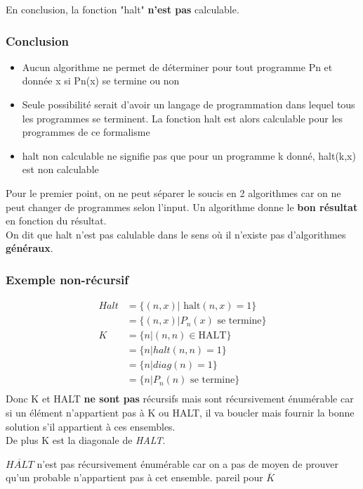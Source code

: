\documentclass{report}
\begin{document}
En conclusion, la fonction "halt" \textbf{n'est pas} calculable.

\subsubsection{Conclusion}
\begin{itemize}
\item  Aucun algorithme ne permet de déterminer pour tout programme Pn et donnée x si Pn(x) se termine ou non
\item Seule possibilité serait d’avoir un langage de programmation dans lequel tous les programmes se terminent. La fonction halt est alors calculable pour les programmes de ce formalisme
\item halt non calculable ne signifie pas que pour un programme k donné, halt(k,x) est
non calculable
\end{itemize}
Pour le premier point, on ne peut séparer le soucis en 2 algorithmes car on ne peut changer de programmes selon l'input. Un algorithme donne le \textbf{bon résultat} en fonction du résultat.\\

On dit que halt n'est pas calulable dans le sens où il n'existe pas d'algorithmes \textbf{généraux}.

\subsubsection{Exemple non-récursif}

\begin{align}
Halt &= \{(n,x) | \text{ halt}(n,x) = 1\}\\
&= \{(n,x) | P_n (x) \text{ se termine}\}\\
K &= \{n | (n,n) \in \text{HALT}\}\\
&= \{n | halt(n,n) = 1\}\\
&= \{n | diag(n) = 1\}\\
&= \{n | P_n(n) \text{ se termine}\}\\
\end{align}
Donc K et HALT \textbf{ne sont pas} récursifs mais sont récursivement énumérable car si un élément n'appartient pas à K ou HALT, il va boucler mais fournir la bonne solution s'il appartient à ces ensembles.\\
De plus K est la diagonale de \textit{HALT}.

$\overline{HALT}$ n'est pas récursivement énumérable car on a pas de moyen de prouver qu'un probable n'appartient pas à cet ensemble. pareil pour $\overline{K}$
\end{document}
